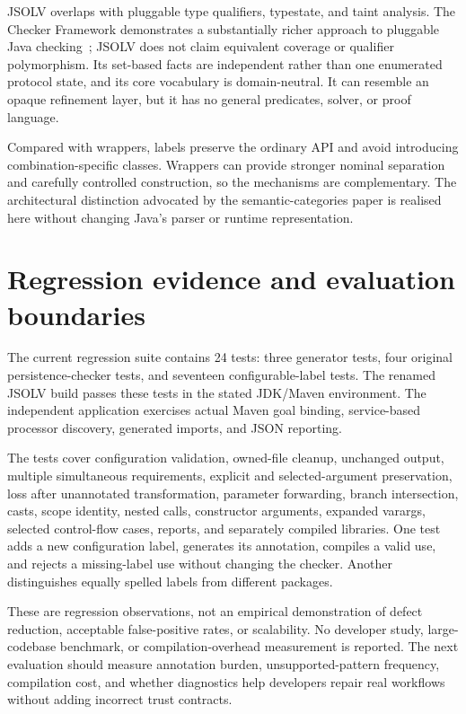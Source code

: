 \documentclass[11pt]{article}
\newcommand{\jsolv}{\textsc{JSOLV}}
\begin{document}
\jsolv{} overlaps with pluggable type qualifiers, typestate, and taint analysis.
The Checker Framework demonstrates a substantially richer approach to pluggable
Java checking~\cite{checker-framework}; \jsolv{} does not claim equivalent
coverage or qualifier polymorphism. Its set-based facts are independent rather
than one enumerated protocol state, and its core vocabulary is domain-neutral.
It can resemble an opaque refinement layer, but it has no general predicates,
solver, or proof language.

Compared with wrappers, labels preserve the ordinary API and avoid introducing
combination-specific classes. Wrappers can provide stronger nominal separation
and carefully controlled construction, so the mechanisms are complementary.
The architectural distinction advocated by the semantic-categories paper is
realised here without changing Java's parser or runtime representation.

\section{Regression evidence and evaluation boundaries}

The current regression suite contains 24 tests: three generator tests,
four original persistence-checker tests, and seventeen configurable-label tests.
The renamed JSOLV build passes these tests in the stated JDK/Maven environment.
The independent application exercises actual Maven goal binding, service-based
processor discovery, generated imports, and JSON reporting.

The tests cover configuration validation, owned-file cleanup, unchanged output,
multiple simultaneous requirements, explicit and selected-argument preservation,
loss after unannotated transformation, parameter forwarding, branch intersection,
casts, scope identity, nested calls, constructor arguments, expanded varargs,
selected control-flow cases, reports, and separately compiled libraries. One
test adds a new configuration label, generates its annotation, compiles a valid
use, and rejects a missing-label use without changing the checker. Another
distinguishes equally spelled labels from different packages.

These are regression observations, not an empirical demonstration of defect
reduction, acceptable false-positive rates, or scalability. No developer study,
large-codebase benchmark, or compilation-overhead measurement is reported.
The next evaluation should measure annotation burden, unsupported-pattern
frequency, compilation cost, and whether diagnostics help developers repair
real workflows without adding incorrect trust contracts.
\end{document}
